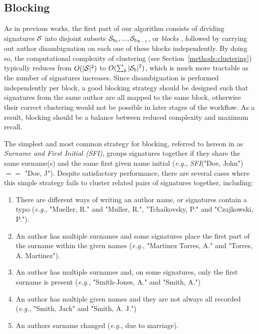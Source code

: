 \documentclass{article}
\newcommand{\eg}{\emph{e.g.}\xspace}
\begin{document}
\subsection{Blocking}
\label{methods:blocking}

As in previous works, the first part of our algorithm consists of dividing
signatures ${\cal S}$ into disjoint subsets ${\cal S}_{b_0}, ..., {\cal
S}_{b_{K-1}}$, or \textit{blocks} \citep{fellegi69}, followed by carrying out
author disambiguation on each one of these blocks independently.
By doing so, the computational complexity of clustering (see Section~\ref{methods:clustering})
typically reduces from $O(|{\cal S}|^2)$ to $O(\sum_b |{\cal S}_b|^2)$, which is much more
tractable as the number of signatures increases.
Since disambiguation is performed independently per block, a good blocking strategy should be
designed such that signatures from the same author are all mapped to the same
block, otherwise their correct clustering would not be possible in later stages of the workflow.
As a result, blocking should be a balance between reduced complexity and maximum recall.

The simplest and most common strategy for blocking, referred to hereon in as \textit{Surname and First Initial (SFI)},
groups signatures together if they share the same surname(s) and the same first
given name initial (\eg, \emph{SFI}("Doe, John") $==$ "Doe, J").
Despite satisfactory performance, there are several cases where this simple strategy fails to cluster related pairs of signatures together, including:

\begin{enumerate}
  \item There are different
  ways of writing an author name, or signatures contain a typo
  (\eg, "Mueller, R." and "Muller, R.", "Tchaikovsky, P." and "Czajkowski, P.").

  \item An author has multiple surnames and some signatures place the first part of the surname within the given names (\eg, "Martinez Torres, A." and "Torres, A. Martinez").

  \item An author has multiple surnames and, on some signatures, only the first surname is
  present (\eg, "Smith-Jones, A." and "Smith, A.")

  \item An author has multiple given names and they are not always all recorded (\eg,
  "Smith, Jack" and "Smith, A. J.")

  \item An authors surname changed (\eg, due to marriage).
\end{enumerate}
\end{document}
